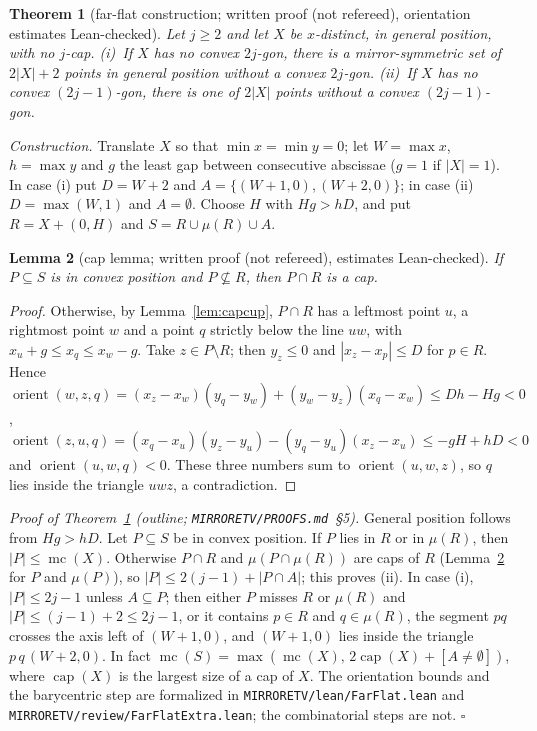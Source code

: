 \documentclass[10pt]{article}
\newtheorem{theorem}{Theorem}[section]
\newtheorem{lemma}[theorem]{Lemma}
\theoremstyle{definition}
\theoremstyle{remark}
\newcommand{\orient}{\operatorname{orient}}
\newcommand{\mc}{\operatorname{mc}}
\newcommand{\dirn}[1]{{\upshape\nolinkurl{#1}}}
\begin{document}
\begin{theorem}[far-flat construction; written proof (not refereed), orientation estimates Lean-checked]\label{thm:B}
Let $j\ge2$ and let $X$ be $x$-distinct, in general position, with no $j$-cap. (i)~If $X$ has no convex $2j$-gon, there
is a mirror-symmetric set of $2|X|+2$ points in general position without a convex $2j$-gon. (ii)~If $X$ has no convex
$(2j-1)$-gon, there is one of $2|X|$ points without a convex $(2j-1)$-gon.
\end{theorem}

\noindent\emph{Construction.} Translate $X$ so that $\min x=\min y=0$; let $W=\max x$, $h=\max y$ and $g$ the least gap
between consecutive abscissae ($g=1$ if $|X|=1$). In case (i) put $D=W+2$ and $A=\{(W+1,0),(W+2,0)\}$; in case (ii)
$D=\max(W,1)$ and $A=\emptyset$. Choose $H$ with $Hg>hD$, and put $R=X+(0,H)$ and $S=R\cup\mu(R)\cup A$.

\begin{lemma}[cap lemma; written proof (not refereed), estimates Lean-checked]\label{lem:caplemma}
If $P\subseteq S$ is in convex position and $P\not\subseteq R$, then $P\cap R$ is a cap.
\end{lemma}

\begin{proof}
Otherwise, by Lemma~\ref{lem:capcup}, $P\cap R$ has a leftmost point $u$, a rightmost point $w$ and a point $q$ strictly
below the line $uw$, with $x_u+g\le x_q\le x_w-g$. Take $z\in P\setminus R$; then $y_z\le0$ and $|x_z-x_p|\le D$ for
$p\in R$. Hence $\orient(w,z,q)=(x_z-x_w)(y_q-y_w)+(y_w-y_z)(x_q-x_w)\le Dh-Hg<0$,
$\orient(z,u,q)=(x_q-x_u)(y_z-y_u)-(y_q-y_u)(x_z-x_u)\le-gH+hD<0$ and $\orient(u,w,q)<0$. These three numbers sum to
$\orient(u,w,z)$, so $q$ lies inside the triangle $uwz$, a contradiction.
\end{proof}

\noindent\emph{Proof of Theorem~\ref{thm:B} (outline; \dirn{MIRRORETV/PROOFS.md}~\S5).} General position follows from
$Hg>hD$. Let $P\subseteq S$ be in convex position. If $P$ lies in $R$ or in $\mu(R)$, then $|P|\le\mc(X)$. Otherwise
$P\cap R$ and $\mu(P\cap\mu(R))$ are caps of $R$ (Lemma~\ref{lem:caplemma} for $P$ and $\mu(P)$), so
$|P|\le2(j-1)+|P\cap A|$; this proves (ii). In case (i), $|P|\le2j-1$ unless $A\subseteq P$; then either $P$ misses $R$ or
$\mu(R)$ and $|P|\le(j-1)+2\le2j-1$, or it contains $p\in R$ and $q\in\mu(R)$, the segment $pq$ crosses the axis left of
$(W+1,0)$, and $(W+1,0)$ lies inside the triangle $p\,q\,(W+2,0)$. In fact $\mc(S)=\max(\mc(X),\,2\operatorname{cap}(X)+
[A\ne\emptyset])$, where $\operatorname{cap}(X)$ is the largest size of a cap of $X$. The orientation bounds and the barycentric step are formalized in \dirn{MIRRORETV/lean/FarFlat.lean}
and \dirn{MIRRORETV/review/FarFlatExtra.lean}; the combinatorial steps are not. \hfill$\square$
\end{document}
